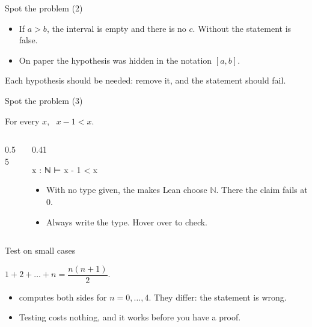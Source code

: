 \documentclass[10pt, aspectratio=169]{beamer}
\begin{document}
\begin{frame}[fragile,t]{Spot the problem (2)}

\pause
\begin{itemize}
\item If $a > b$, the interval is empty and there is no $c$. Without  the statement is false.
\item On paper the hypothesis was hidden in the notation $[a, b]$.
\end{itemize}

\begin{keypoint}
\normalsize Each hypothesis should be needed: remove it, and the statement should fail.
\end{keypoint}
\end{frame}

\begin{frame}[fragile,t]{Spot the problem (3)}
\begin{paper}[Claim]
For every $x$, \ $x - 1 < x$.
\end{paper}

\pause
\begin{columns}[T]
\begin{column}{0.55\textwidth}
\end{column}
\begin{column}{0.41\textwidth}
\begin{goal}
x : ℕ
⊢ x - 1 < x
\end{goal}
\small
\begin{itemize}
\item With no type given, the  makes Lean choose $\mathbb{N}$. There the claim fails at $0$.
\item Always write the type. Hover over  to check.
\end{itemize}
\end{column}
\end{columns}
\end{frame}

\begin{frame}[fragile]{Test on small cases\livedemo}
\begin{paper}[Claim]
$1 + 2 + \dots + n = \dfrac{n(n+1)}{2}$.
\end{paper}


\begin{itemize}
\item {} computes both sides for $n = 0, \dots, 4$. They differ: the statement is wrong.
\item Testing costs nothing, and it works before you have a proof.
\end{itemize}
\end{frame}
\end{document}
